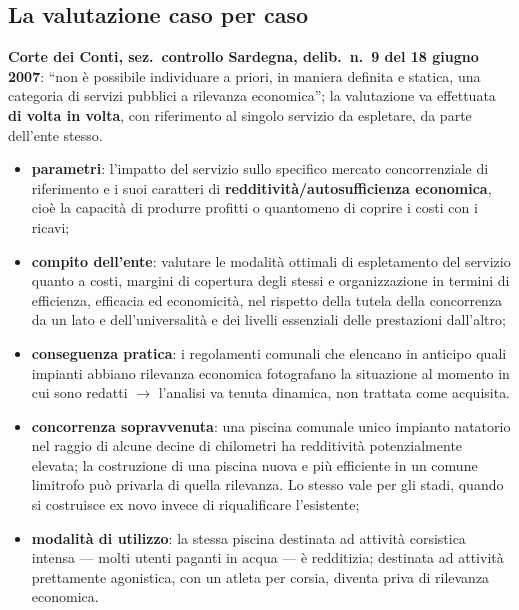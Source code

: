 \subsection{La valutazione caso per caso}

\textbf{Corte dei Conti, sez.\ controllo Sardegna, delib.\ n.\ 9 del 18 giugno 2007}: ``non è
possibile individuare a priori, in maniera definita e statica, una categoria di servizi pubblici a
rilevanza economica''; la valutazione va effettuata \textbf{di volta in volta}, con riferimento al
singolo servizio da espletare, da parte dell'ente stesso.

\begin{itemize}
  \item \textbf{parametri}: l'impatto del servizio sullo specifico mercato concorrenziale di
    riferimento e i suoi caratteri di \textbf{redditività/autosufficienza economica}, cioè la
    capacità di produrre profitti o quantomeno di coprire i costi con i ricavi;
  \item \textbf{compito dell'ente}: valutare le modalità ottimali di espletamento del servizio
    quanto a costi, margini di copertura degli stessi e organizzazione in termini di efficienza,
    efficacia ed economicità, nel rispetto della tutela della concorrenza da un lato e
    dell'universalità e dei livelli essenziali delle prestazioni dall'altro;
  \item \textbf{conseguenza pratica}: i regolamenti comunali che elencano in anticipo quali
    impianti abbiano rilevanza economica fotografano la situazione al momento in cui sono redatti
    $\rightarrow$ l'analisi va tenuta dinamica, non trattata come acquisita.
\end{itemize}


\begin{itemize}
  \item \textbf{concorrenza sopravvenuta}: una piscina comunale unico impianto natatorio nel raggio
    di alcune decine di chilometri ha redditività potenzialmente elevata; la costruzione di una
    piscina nuova e più efficiente in un comune limitrofo può privarla di quella rilevanza. Lo
    stesso vale per gli stadi, quando si costruisce ex novo invece di riqualificare l'esistente;
  \item \textbf{modalità di utilizzo}: la stessa piscina destinata ad attività corsistica intensa
    --- molti utenti paganti in acqua --- è redditizia; destinata ad attività prettamente
    agonistica, con un atleta per corsia, diventa priva di rilevanza economica.
\end{itemize}

